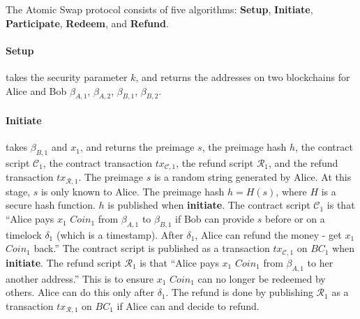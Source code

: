 The Atomic Swap protocol consists of five algorithms:
\textbf{Setup},
\textbf{Initiate},
\textbf{Participate},
\textbf{Redeem}, and
\textbf{Refund}.


\paragraph{\textbf{Setup}}
takes the security parameter $k$,
and returns the addresses on two blockchains for Alice and Bob $\beta_{A, 1}$, $\beta_{A, 2}$, $\beta_{B, 1}$, $\beta_{B, 2}$.

\paragraph{\textbf{Initiate}}
takes $\beta_{B, 1}$ and $x_1$,
and returns the preimage $s$, the preimage hash $h$, the contract script $\mathcal{C}_1$, the contract transaction $tx_{\mathcal{C}, 1}$, the refund script $\mathcal{R}_1$, and the refund transaction $tx_{\mathcal{R}, 1}$.
The preimage $s$ is a random string generated by Alice. At this stage, $s$ is only known to Alice.
The preimage hash $h = H(s)$, where $H$ is a secure hash function.  $h$ is published when \textbf{initiate}.
The contract script $\mathcal{C}_1$ is that ``Alice pays $x_1$ $Coin_1$ from $\beta_{A, 1}$ to $\beta_{B, 1}$ if Bob can provide $s$ before or on a timelock $\delta_1$ (which is a timestamp). After $\delta_1$, Alice can refund the money - get $x_1$ $Coin_1$ back.''
The contract script is published as a transaction $tx_{\mathcal{C}, 1}$ on $BC_1$ when \textbf{initiate}.
The refund script $\mathcal{R}_1$ is that ``Alice pays $x_1$ $Coin_1$ from $\beta_{A, 1}$ to her another address.'' This is to ensure $x_1$ $Coin_1$ can no longer be redeemed by others. Alice can do this only after $\delta_1$.
The refund is done by publishing $\mathcal{R}_1$ as a transaction $tx_{\mathcal{R}, 1}$ on $BC_1$ if Alice can and decide to refund.

